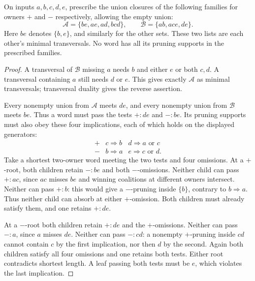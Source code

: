 \begin{proposition}
\label{core:prop:dual-pruning-obstruction}
On inputs $a,b,c,d,e$, prescribe the union closures of the following
families for owners $+$ and $-$ respectively, allowing the empty union:
\[
 \mathcal A=\{be,ae,ad,bcd\},\qquad
 \mathcal B=\{ab,ace,de\}.
\]
Here $be$ denotes $\{b,e\}$, and similarly for the other sets.
These two lists are each other's minimal transversals. No word has
all its pruning supports in the prescribed families.
\end{proposition}
\begin{proof}
A transversal of $\mathcal B$ missing $a$ needs $b$ and either $e$
or both $c,d$. A transversal containing $a$ still needs $d$ or $e$.
This gives exactly $\mathcal A$ as minimal transversals; transversal
duality gives the reverse assertion.

Every nonempty union from $\mathcal A$ meets $de$, and every nonempty
union from $\mathcal B$ meets $be$. Thus a word must pass the tests
$+:de$ and $-:be$. Its pruning supports must also obey these four
implications, each of which holds on the displayed generators:
\[
 \begin{array}{c|ll}
 + & c\Rightarrow b & d\Rightarrow a\text{ or }c\\
 - & b\Rightarrow a & e\Rightarrow c\text{ or }d .
 \end{array}
\]
Take a shortest two-owner word meeting the two tests and four omissions.
At a $+$-root, both children retain $-:be$ and both $-$-omissions.
Neither child can pass $+:ac$, since $ac$ misses $be$ and winning
coalitions at different owners intersect. Neither can pass $+:b$:
this would give a $-$-pruning inside $\{b\}$, contrary to $b\Rightarrow a$.
Thus neither child can absorb at either $+$-omission. Both children
must already satisfy them, and one retains $+:de$.

At a $-$-root both children retain $+:de$ and the $+$-omissions.
Neither can pass $-:a$, since $a$ misses $de$. Neither can pass
$-:cd$: a nonempty $+$-pruning inside $cd$ cannot contain $c$ by
the first implication, nor then $d$ by the second. Again both children
satisfy all four omissions and one retains both tests. Either root
contradicts shortest length. A leaf passing both tests must be $e$,
which violates the last implication.
\end{proof}
